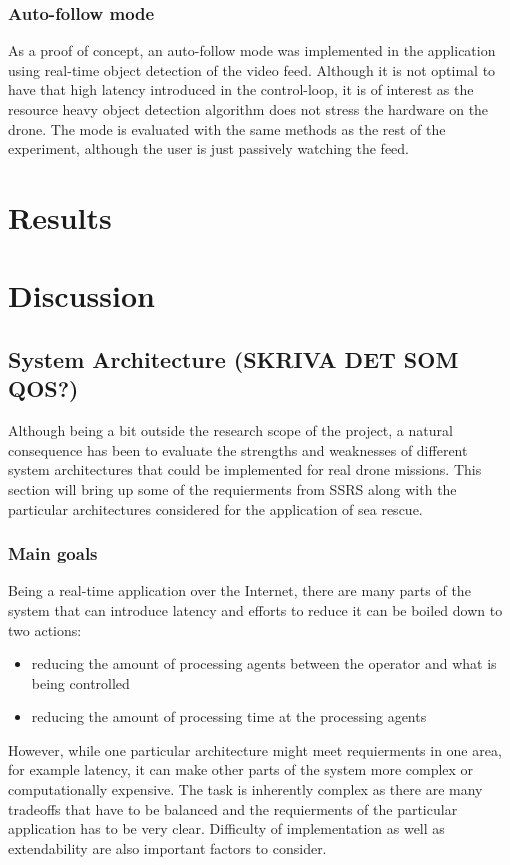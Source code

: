 \documentclass[nofilelist]{cslthse-msc}
\begin{document}
\subsection{Auto-follow mode}
As a proof of concept, an auto-follow mode was implemented in the application using real-time object detection of the video feed. Although it is not optimal to have that high latency introduced in the control-loop, it is of interest as the resource heavy object detection algorithm does not stress the hardware on the drone. The mode is evaluated with the same methods as the rest of the experiment, although the user is just passively watching the feed.  

\chapter{Results}

\chapter{Discussion}
\section{System Architecture (SKRIVA DET SOM QOS?)}
Although being a bit outside the research scope of the project, a natural consequence has been to evaluate the strengths and weaknesses of different system architectures that could be implemented for real drone missions. This section will bring up some of the requierments from SSRS along with the particular architectures considered for the application of sea rescue.

\subsection{Main goals}
Being a real-time application over the Internet, there are many parts of the system that can introduce latency and efforts to reduce it can be boiled down to two actions: 
\begin{itemize}
   \item reducing the amount of processing agents between the operator and what is being controlled
   \item reducing the amount of processing time at the processing agents
\end{itemize} 
However, while one particular architecture might meet requierments in one area, for example latency, it can make other parts of the system more complex or computationally expensive. The task is inherently complex as there are many tradeoffs that have to be balanced and the requierments of the particular application has to be very clear. Difficulty of implementation as well as extendability are also important factors to consider. 
\end{document}
